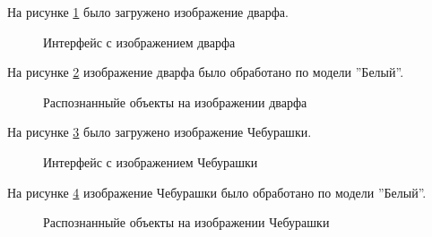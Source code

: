 На рисунке \ref{systemtest_responce17:image} было загружено изображение дварфа.

\begin{figure}[H]
\caption{Интерфейс с изображением дварфа}
\label{systemtest_responce17:image}
\end{figure}

На рисунке \ref{systemtest_responce18:image} изображение дварфа было обработано по модели ''Белый''.

\begin{figure}[H]
\caption{Распознанныйе объекты на изображении дварфа}
\label{systemtest_responce18:image}
\end{figure}
На рисунке \ref{systemtest_responce19:image} было загружено изображение Чебурашки.

\begin{figure}[H]
\caption{Интерфейс с изображением Чебурашки}
\label{systemtest_responce19:image}
\end{figure}

На рисунке \ref{systemtest_responce20:image} изображение Чебурашки было обработано по модели ''Белый''.

\begin{figure}[H]
\caption{Распознанныйе объекты на изображении Чебурашки}
\label{systemtest_responce20:image}
\end{figure}
